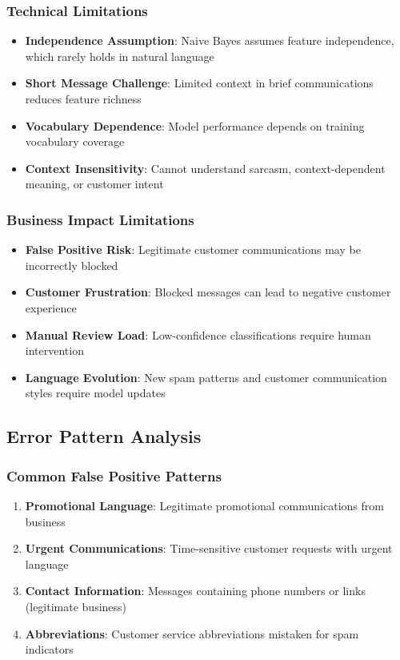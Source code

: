 \documentclass[12pt,a4paper]{article}
\begin{document}
\subsubsection{Technical Limitations}

\begin{itemize}
    \item \textbf{Independence Assumption}: Naive Bayes assumes feature independence, which rarely holds in natural language
    \item \textbf{Short Message Challenge}: Limited context in brief communications reduces feature richness
    \item \textbf{Vocabulary Dependence}: Model performance depends on training vocabulary coverage
    \item \textbf{Context Insensitivity}: Cannot understand sarcasm, context-dependent meaning, or customer intent
\end{itemize}

\subsubsection{Business Impact Limitations}

\begin{itemize}
    \item \textbf{False Positive Risk}: Legitimate customer communications may be incorrectly blocked
    \item \textbf{Customer Frustration}: Blocked messages can lead to negative customer experience
    \item \textbf{Manual Review Load}: Low-confidence classifications require human intervention
    \item \textbf{Language Evolution}: New spam patterns and customer communication styles require model updates
\end{itemize}

\subsection{Error Pattern Analysis}

\subsubsection{Common False Positive Patterns}

\begin{enumerate}
    \item \textbf{Promotional Language}: Legitimate promotional communications from business
    \item \textbf{Urgent Communications}: Time-sensitive customer requests with urgent language
    \item \textbf{Contact Information}: Messages containing phone numbers or links (legitimate business)
    \item \textbf{Abbreviations}: Customer service abbreviations mistaken for spam indicators
\end{enumerate}
\end{document}
